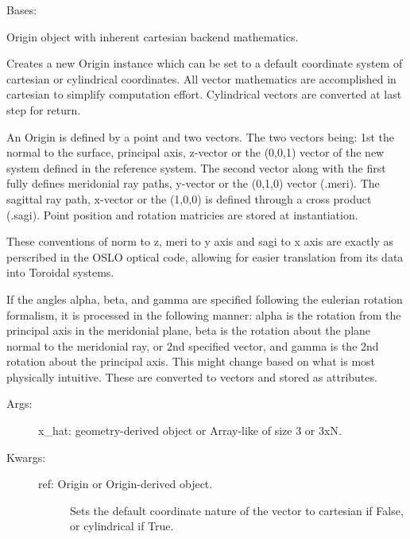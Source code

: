 \documentclass[letterpaper,10pt,english]{sphinxmanual}
\begin{document}
\begin{fulllineitems}
\label{TRIPPy:TRIPPy.surface.Ellipse}
Bases: {\hyperref[TRIPPy:TRIPPy.surface.Surf]{}}

Origin object with inherent cartesian backend mathematics.

Creates a new Origin instance which can be set to a default 
coordinate system of cartesian or cylindrical coordinates.
All vector mathematics are accomplished in cartesian to 
simplify computation effort. Cylindrical vectors are
converted at last step for return.

An Origin is defined by a point and two vectors. The two 
vectors being: 1st the normal to the surface, principal axis,
z-vector or the (0,0,1) vector of the new system defined in
the reference system. The second vector along with the 
first fully defines meridonial ray paths, y-vector or the
(0,1,0) vector (.meri). The sagittal ray path, x-vector or
the (1,0,0) is defined through a cross product (.sagi).
Point position and rotation matricies are stored at
instantiation.

These conventions of norm to z, meri to y axis and sagi to
x axis are exactly as perscribed in the OSLO optical code,
allowing for easier translation from its data into Toroidal
systems.

If the angles alpha, beta, and gamma are specified following
the eulerian rotation formalism, it is processed in the 
following manner: alpha is the rotation from the principal
axis in the meridonial plane, beta is the rotation about the
plane normal to the meridonial ray, or 2nd specified vector,
and gamma is the 2nd rotation about the principal axis. 
This might change based on what is most physically intuitive.
These are converted to vectors and stored as attributes.
\begin{description}
\item[{Args:}] \leavevmode
x\_hat: geometry-derived object or Array-like of size 3 or 3xN.

\item[{Kwargs:}] \leavevmode\begin{description}
\item[{ref: Origin or Origin-derived object.}] \leavevmode
Sets the default coordinate nature of the vector to 
cartesian if False, or cylindrical if True.


\end{description}
\end{description}
\end{fulllineitems}
\end{document}

